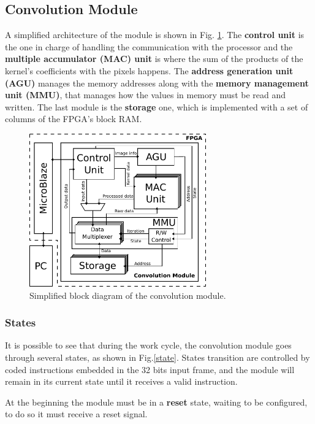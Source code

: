 \documentclass[conference,compsoc]{IEEEtran}
\begin{document}
\subsection{Convolution Module}
A simplified architecture of the module is shown in Fig. \ref{general}.
The \textbf{control unit} is the one in charge of handling the communication
with the processor and the \textbf{multiple accumulator (MAC) unit} is where the sum of
the products of the kernel's coefficients with the pixels happens. The
\textbf{address generation unit (AGU)} manages the memory addresses along with the
\textbf{memory management unit (MMU)}, that manages how the values in memory must be
read and written. The last module is the \textbf{storage} one, which is implemented with a
set of columns of the FPGA's block RAM.

\begin{figure}[!t]
\centering
\includegraphics[width=3in]{general.pdf}
\caption{Simplified block diagram of the convolution module.}
\label{general}
\end{figure}

\subsubsection{States}
It is possible to see that during the work cycle, the convolution module goes
through several states, as shown in Fig.\ref{state}.
States transition are controlled by coded instructions embedded in the 32 bits input frame,
and the module will remain in its current state until it receives a valid instruction.

At the beginning the module must be in a \textbf{reset} state, waiting to be
configured, to do so it must receive a reset signal.


\end{document}
